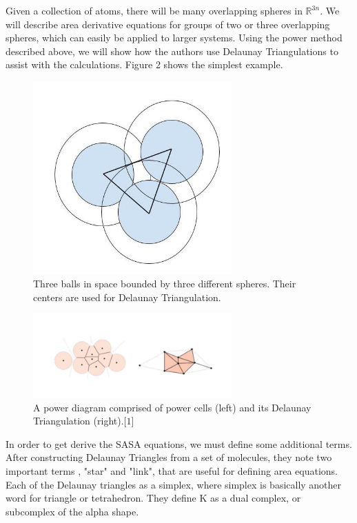 \documentclass{article}
\newcommand{\R}{\mathbb{R}}
\begin{document}
Given a collection of atoms, there will be many overlapping spheres in $\R^{3n}$. We will describe area derivative equations for groups of two or three overlapping spheres, which can easily be applied to larger systems. Using the power method described above, we will show how the authors use Delaunay Triangulations to assist with the calculations. Figure 2 shows the simplest example.

\begin{figure}[h!]
\caption{Three balls in space bounded by three different spheres. Their centers are used for Delaunay Triangulation.}
\centerline{\includegraphics[width=3in]{Figure2}}
\end{figure}

\begin{figure}[h!]
\caption{A power diagram comprised of power cells (left) and its Delaunay Triangulation (right).$\lbrack1\rbrack$}
\centerline{\includegraphics[width=3in]{Figure4}}
\end{figure}


In order to get derive the SASA equations, we must define some additional terms. After constructing Delaunay Triangles from a set of molecules, they note two important terms , "star" and "link", that are useful for defining area equations. Each of the Delaunay triangles as a simplex, where simplex is basically another word for triangle or tetrahedron. They define K as a dual complex, or subcomplex of the alpha shape.
\end{document}
